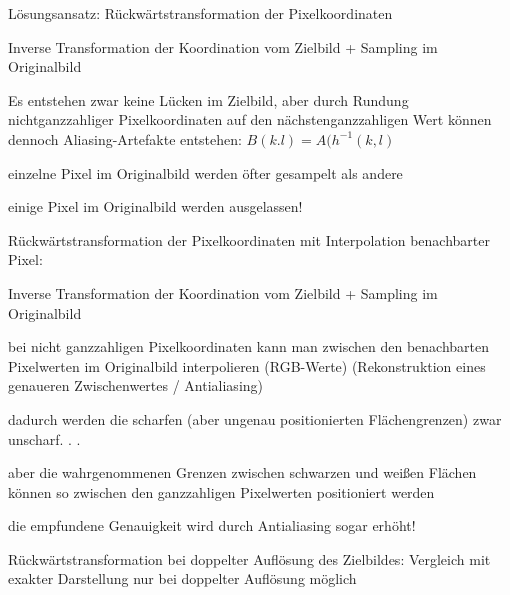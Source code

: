 \documentclass[landscape]{article}
\begin{document}
\begin{multicols}{3}
  Lösungsansatz: Rückwärtstransformation der Pixelkoordinaten
  \begin{itemize*}
    \item Inverse Transformation der Koordination vom Zielbild + Sampling im Originalbild
    \item Es entstehen zwar keine Lücken im Zielbild, aber durch Rundung nichtganzzahliger Pixelkoordinaten auf den nächstenganzzahligen Wert können dennoch Aliasing-Artefakte entstehen: $B(k.l)=A(h^{-1}(k,l)$
    \begin{itemize*}
      \item einzelne Pixel im Originalbild werden öfter gesampelt als andere
      \item einige Pixel im Originalbild werden ausgelassen!
    \end{itemize*}
  \end{itemize*}
  
  
  Rückwärtstransformation der Pixelkoordinaten mit Interpolation benachbarter Pixel:
  \begin{itemize*}
    \item Inverse Transformation der Koordination vom Zielbild + Sampling im Originalbild
    \item bei nicht ganzzahligen Pixelkoordinaten kann man zwischen den benachbarten Pixelwerten im Originalbild interpolieren (RGB-Werte) (Rekonstruktion eines genaueren Zwischenwertes / Antialiasing)
    \item dadurch werden die scharfen (aber ungenau positionierten Flächengrenzen) zwar unscharf. . .
    \item aber die wahrgenommenen Grenzen zwischen schwarzen und weißen Flächen können so zwischen den ganzzahligen Pixelwerten positioniert werden
    \item die empfundene Genauigkeit wird durch Antialiasing sogar erhöht!
  \end{itemize*}
  
  
  Rückwärtstransformation bei doppelter Auflösung des Zielbildes: Vergleich mit exakter Darstellung nur bei doppelter Auflösung möglich
  

\end{multicols}
\end{document}
